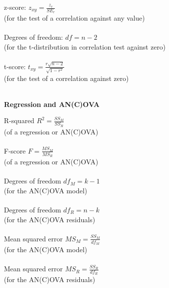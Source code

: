\begin{minipage}[t]{.45\textwidth}
z-score: \hfill $z_{xy} = \frac{z_r}{SE_r}$\\
{\scriptsize (for the test of a correlation against any value)} \\
\\
Degrees of freedom: \hfill $df = n - 2$\\
{\scriptsize (for the t-distribution in correlation test against zero)} \\
\\
t-score: \hfill $t_{xy} = \frac{r \sqrt{n - 2}}{\sqrt{1 - r^2}}$\\
{\scriptsize (for the test of a correlation against zero)} \\
\\
\begin{center}
    \textbf{Regression and AN(C)OVA}
\end{center}
\hline
\answerskip
R-squared \hfill $R^2 = \frac{SS_M}{SS_R}$ \\
{\scriptsize (of a regression or AN(C)OVA)} \\
\\
F-score \hfill $F = \frac{MS_M}{MS_R}$ \\
{\scriptsize (of a regression or AN(C)OVA)} \\
\\
Degrees of freedom \hfill $df_M = k - 1$ \\
{\scriptsize (for the AN(C)OVA model)} \\
\\
Degrees of freedom \hfill $df_R = n - k$ \\
{\scriptsize (for the AN(C)OVA residuals)} \\
\\
Mean squared error \hfill $MS_M = \frac{SS_M}{df_M}$ \\
{\scriptsize (for the AN(C)OVA model)} \\
\\
Mean squared error \hfill $MS_R = \frac{SS_R}{df_R}$ \\
{\scriptsize (for the AN(C)OVA residuals)} \\
\\
\end{minipage}
\hfill\vline\hfill
